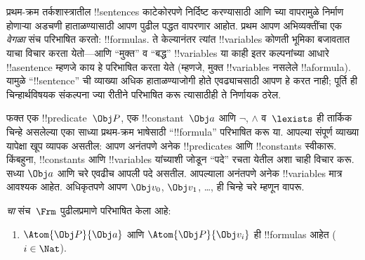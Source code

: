 \documentclass[../../../include/open-logic-section]{subfiles}
\begin{document}

\section{}

प्रथम-क्रम तर्कशास्त्रातील !!{sentence}s काटेकोरपणे निर्दिष्ट करण्यासाठी
आणि च्या वापरामुळे निर्माण होणाऱ्या अडचणी हाताळण्यासाठी
आपण पुढील पद्धत वापरणार आहोत. प्रथम आपण अभिव्यक्तींचा एक
\emph{वेगळा} संच परिभाषित करतो: !!{formula}s. ते केल्यानंतर त्यांत
!!{variable}s कोणती भूमिका बजावतात याचा विचार करता येतो---आणि
``मुक्त'' व ``बद्ध'' !!{variable}s या काही इतर कल्पनांच्या आधारे
!!a{sentence} म्हणजे काय हे परिभाषित करता येते (म्हणजे, मुक्त
!!{variable}s नसलेले !!a{formula}). यामुळे ``!!{sentence}'' ची व्याख्या
अधिक हाताळण्याजोगी होते एवढ्याचसाठी आपण हे करत नाही; पूर्ति ही
चिन्हार्थविषयक संकल्पना ज्या रीतीने परिभाषित करू त्यासाठीही ते
निर्णायक ठरेल.

फक्त एक !!{predicate}~$\Obj P$, एक !!{constant}~$\Obj a$ आणि
$\lnot$, $\land$ व~$\lexists$ ही तार्किक चिन्हे असलेल्या एका साध्या
प्रथम-क्रम भाषेसाठी ``!!{formula}'' परिभाषित करू या. आपल्या संपूर्ण
व्याख्या यापेक्षा खूप व्यापक असतील: आपण अनंतपणे अनेक !!{predicate}s
आणि !!{constant}s स्वीकारू. किंबहुना, !!{constant}s आणि !!{variable}s
यांच्याशी जोडून ``पदे'' रचता येतील अशा चाही विचार करू.
सध्या $\Obj a$ आणि चरे एवढीच आपली पदे असतील. आपल्याला अनंतपणे अनेक
!!{variable}s मात्र आवश्यक आहेत. अधिकृतपणे आपण $\Obj v_0$, $\Obj
v_1$, \dots, ही चिन्हे चरे म्हणून वापरू.

\begin{defn}
\emph{चा} संच~$\Frm$ पुढीलप्रमाणे परिभाषित केला आहे:
\begin{enumerate}
\item{} $\Atom{\Obj P}{\Obj a}$ आणि $\Atom{\Obj
  P}{\Obj v_i}$ ही !!{formula}s आहेत ($i \in \Nat$).




\end{enumerate}
\end{defn}
\end{document}
